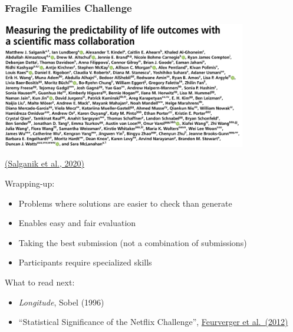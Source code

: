\documentclass[aspectratio=169]{beamer}
\begin{document}
\begin{frame}
\frametitle{Fragile Families Challenge}

\begin{center}
\includegraphics[width=0.8\textwidth]{figures/salganik_measuring_2020_title_authors}
\end{center}

\vfill
\href{https://doi.org/10.1073/pnas.1915006117}{(Salganik et al., 2020)}

\end{frame}
\begin{frame}

Wrapping-up:
\begin{itemize}
\item Problems where solutions are easier to check than generate
\pause
\item Enables easy and fair evaluation 
\pause
\item Taking the best submission (not a combination of submissions)
\pause
\item Participants require specialized skills 
\end{itemize}

\end{frame}
\begin{frame}

What to read next:
\begin{itemize}
\item \textit{Longitude}, Sobel (1996)
\item ``Statistical Significance of the Netflix Challenge'', \href{https://dx.doi.org/10.1214/11-STS368}{Feurverger et al.\ (2012)}
\end{itemize}

\end{frame}
\frame{\titlepage}
\end{document}
